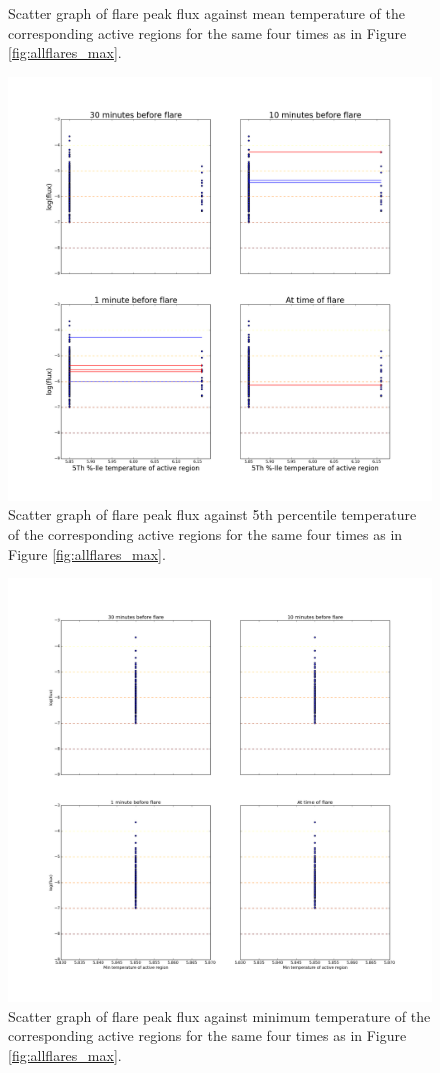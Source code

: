 \documentclass[referee,a4paper,12pt]{swsc}
\begin{document}
\begin{linenumbers}
\begin{figure}
	\caption{Scatter graph of flare peak flux against mean temperature of the corresponding active regions for the same four times as in Figure \ref{fig:allflares_max}.}
	\label{fig:allflares_mean}
\end{figure}
\begin{figure}
	\centering
		\includegraphics[width=0.9\columnwidth]{tempplots_p5/allflares.png}
	\caption{Scatter graph of flare peak flux against 5th percentile temperature of the corresponding active regions for the same four times as in Figure \ref{fig:allflares_max}.}
	\label{fig:allflares_p5}
\end{figure}
\begin{figure}
	\centering
		\includegraphics[width=0.9\columnwidth]{tempplots_min/allflares.png}
	\caption{Scatter graph of flare peak flux against minimum temperature of the corresponding active regions for the same four times as in Figure \ref{fig:allflares_max}.}
	\label{fig:allflares_min}
\end{figure}


\end{linenumbers}
\end{document}
